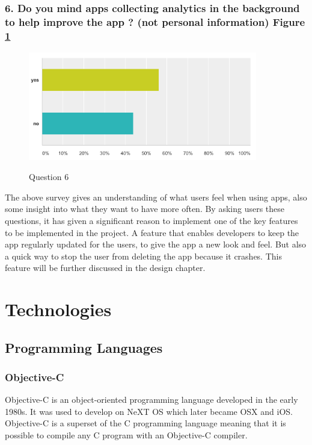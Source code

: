 \subsubsection{6. Do you mind apps collecting analytics in the background to help improve the app ? (not personal information) Figure \ref{fig:label6} }

\begin{figure}[!h]
    \caption{Question 6}
    \centering
    \includegraphics[width=100mm]{images/survey/analytics}
    \label{fig:label6}
\end{figure}


The above survey gives an understanding of what users feel when using apps, also some insight into what they want to have more often. By asking users these questions, it has given a significant reason to implement one of the key features to be implemented in the project. A feature that enables developers to keep the app regularly updated for the users, to give the app a new look and feel. But also a quick way to stop the user from deleting the app because it crashes. This feature will be further discussed in the design chapter.



\section{Technologies}

\subsection{Programming Languages}

\subsubsection{Objective-C}
Objective-C \cite{objectiveC}  is an object-oriented programming language developed in the early 1980s. It was used to develop on NeXT OS which later became OSX and iOS. Objective-C is a superset of the C programming language meaning that it is possible to compile any C program with an Objective-C compiler. 

